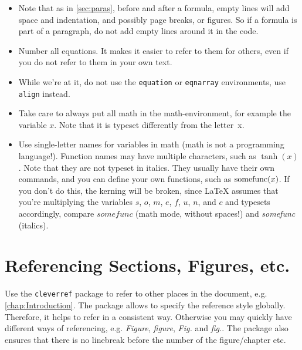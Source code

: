 \documentclass[../{{cookiecutter.project_slug}}.tex]{subfiles}
\begin{document}
    \begin{itemize}
        \item
    Note that  as in \cref{sec:paras},  before and after a  formula, empty 
    lines will  add space  and indentation, and  possibly page  breaks, or 
    figures.  So  if a formula  is part of a  paragraph, do not  add empty 
    lines around it in the code.                                           

        \item
    Number all equations.  It makes it  easier to refer to them for others,
    even if you do not refer to them in your own text.

        \item
    While we're at  it, do not use the  \verb+equation+ or \verb+eqnarray+ 
    environments, use \verb+align+ instead.

        \item
    Take care to always put all  math in the math-environment, for example 
    the  variable $x$.   Note  that  it is  typeset  differently from  the 
    letter~x.

        \item
    Use  single-letter  names  for  variables   in  math  (math  is  not  a
    programming language!).   Function names  may have  multiple characters,
    such as $\tanh(x)$.  Note that they are not typeset in italics.  
    They  usually have  their own  commands, and  you can  define your  own
    functions, such as  $\operatorname*{somefunc}(x)$.  If you don't do  this, the kerning
    will  be broken,  since \LaTeX{}  assumes that  you're multiplying  the
    variables  $s$, $o$,  $m$, $e$,  $f$, $u$,  $n$, and  $c$ and  typesets
    accordingly,  compare  $somefunc$  (math  mode,  without  spaces!)  and
    \emph{somefunc} (italics).

    \end{itemize}

    \section{Referencing Sections, Figures, etc.}
    Use  the \verb+cleverref+  package to  refer  to other  places in  the 
    document,  e.g.  \cref{chap:Introduction}.    The  package  allows  to 
    specify the reference style globally.  Therefore, it helps to refer in 
    a consistent  way.  Otherwise you  may quickly have different  ways of 
    referencing,   e.g.  \emph{Figure},   \emph{figure},  \emph{Fig.}   and
    \emph{fig.}.   The package  also ensures  that there  is no  linebreak 
    before the number of the figure/chapter etc.                           
\end{document}
